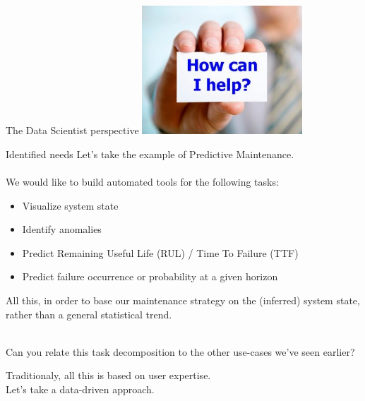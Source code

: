 \documentclass{beamer}
\begin{document}
\begin{frame}{The Data Scientist perspective}
\centering \includegraphics[width=6cm]{img/How-can-i-help.jpg}
\end{frame}

\begin{frame}{Identified needs}
Let's take the example of Predictive Maintenance.\\
~\\
We would like to build automated tools for the following tasks:
\begin{itemize}
\item Visualize system state
\item Identify anomalies
\item Predict Remaining Useful Life (RUL) / Time To Failure (TTF)
\item Predict failure occurrence or probability at a given horizon
\end{itemize}
All this, in order to base our maintenance strategy on the (inferred) system state, rather than a general statistical trend.\\
~\\
\begin{block}{}
Can you relate this task decomposition to the other use-cases we've seen earlier?
\end{block}
Traditionaly, all this is based on user expertise.\\
Let's take a data-driven approach.
\end{frame}
\end{document}

